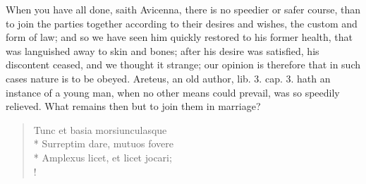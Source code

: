 When you have all done, saith Avicenna, there is no speedier or
safer course, than to join the parties together according to their
desires and wishes, the custom and form of law; and so we have seen him
quickly restored to his former health, that was languished away to skin
and bones; after his desire was satisfied, his discontent ceased, and
we thought it strange; our opinion is therefore that in such cases
nature is to be obeyed. Areteus, an old author, lib. 3. cap. 3. hath an
instance of a young man, when no other means could prevail, was
so speedily relieved. What remains then but to join them in marriage?
%
\begin{latin}%
\begin{verse}%
Tunc et basia morsiunculasque\\*
Surreptim dare, mutuos fovere\\*
Amplexus licet, et licet jocari;\\!
\end{verse}%
\end{latin}%
%

